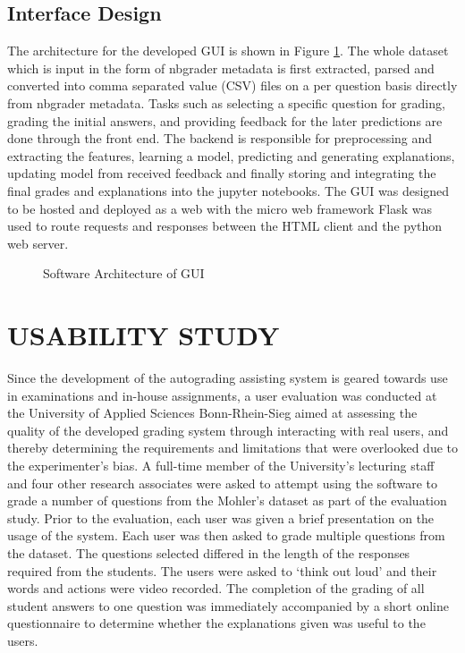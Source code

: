 \documentclass[letterpaper, 10 pt, conference]{ieeeconf}  %
\begin{document}
\subsection{Interface Design}

The architecture for the developed GUI is shown in Figure \ref{fig:arch}. The whole dataset which is input in the form of nbgrader metadata is first extracted, parsed and converted into comma separated value (CSV) files on a per question basis directly from nbgrader metadata. Tasks such as selecting a specific question for grading, grading the initial answers, and providing feedback for the later predictions are done through the front end. The backend is responsible for preprocessing and extracting the features, learning a model, predicting and generating explanations, updating model from received feedback and finally storing and integrating the final grades and explanations into the jupyter notebooks. The GUI was designed to be hosted and deployed as a web with the micro web framework Flask was used to route requests and responses between the HTML client and the python web server.
\begin{figure}[H]
\caption{Software Architecture of GUI}
\label{fig:arch}
\end{figure}

\section{USABILITY STUDY} 
Since the development of the autograding assisting system is geared towards use in examinations and in-house assignments, a user evaluation was conducted at the University of Applied Sciences Bonn-Rhein-Sieg aimed at assessing the quality of the developed grading system through interacting with real users, and thereby determining the requirements and limitations that were overlooked due to the experimenter's bias. A full-time member of the University's lecturing staff and four other research associates were asked to attempt using the software to grade a number of questions from the Mohler's dataset as part of the evaluation study. Prior to the evaluation, each user was given a brief presentation on the usage of the system. Each user was then asked to grade multiple questions from the dataset. The questions selected differed in the length of the responses required from the students. The users were asked to `think out loud' and their words and actions were video recorded. The completion of the grading of all student answers to one question was immediately accompanied by a short online questionnaire to determine whether the explanations given was useful to the users.
\end{document}

